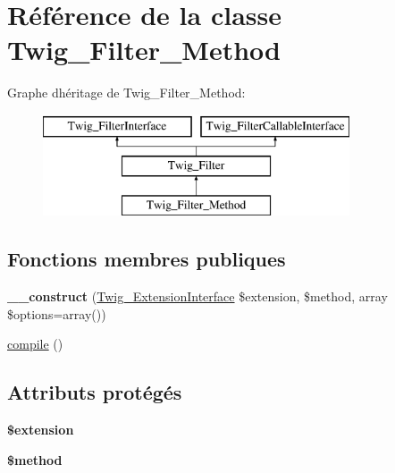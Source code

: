\hypertarget{class_twig___filter___method}{}\section{Référence de la classe Twig\+\_\+\+Filter\+\_\+\+Method}
\label{class_twig___filter___method}
Graphe d\textquotesingle{}héritage de Twig\+\_\+\+Filter\+\_\+\+Method\+:\begin{figure}[H]
\begin{center}
\leavevmode
\includegraphics[height=3.000000cm]{class_twig___filter___method}
\end{center}
\end{figure}
\subsection*{Fonctions membres publiques}
\begin{DoxyCompactItemize}
\item 
{\bfseries \+\_\+\+\_\+construct} (\hyperlink{interface_twig___extension_interface}{Twig\+\_\+\+Extension\+Interface} \$extension, \$method, array \$options=array())\hypertarget{class_twig___filter___method_a7d07ee619832b0ff21eaf3c7c0159c3f}{}\label{class_twig___filter___method_a7d07ee619832b0ff21eaf3c7c0159c3f}

\item 
\hyperlink{class_twig___filter___method_a3815e7c2e73f00c2ebffcf5b90eef3b1}{compile} ()
\end{DoxyCompactItemize}
\subsection*{Attributs protégés}
\begin{DoxyCompactItemize}
\item 
{\bfseries \$extension}\hypertarget{class_twig___filter___method_aed02cd2cd0ee08bd99a2ac1ef4f955ce}{}\label{class_twig___filter___method_aed02cd2cd0ee08bd99a2ac1ef4f955ce}

\item 
{\bfseries \$method}\hypertarget{class_twig___filter___method_a12661b2fc0f57f97e30a1620889ce9c6}{}\label{class_twig___filter___method_a12661b2fc0f57f97e30a1620889ce9c6}

\end{DoxyCompactItemize}


